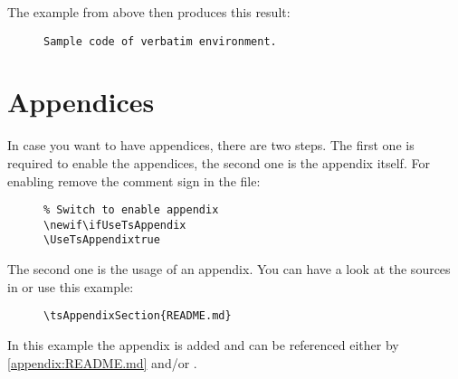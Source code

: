 The example from above then produces this result:

\begin{figure}[H]
    \small
    \centering
    \begin{BVerbatim}
Sample code of verbatim environment.
    \end{BVerbatim}
\end{figure}

\section{Appendices}

In case you want to have appendices, there are two steps. The first one is
required to enable the appendices, the second one is the appendix itself.
For enabling remove the comment sign in the 
file:

\begin{figure}[H]
    \small
    \centering
    \begin{BVerbatim}
\newif\ifUseTsAppendix
\UseTsAppendixtrue
    \end{BVerbatim}
\end{figure}

The second one is the usage of an appendix. You can have a look at the sources
in  or use this example:

\begin{figure}[H]
    \small
    \centering
    \begin{BVerbatim}
\tsAppendixSection{README.md}
    \end{BVerbatim}
\end{figure}

In this example the appendix  is added and can be
referenced either by \ref{appendix:README.md} and/or .
